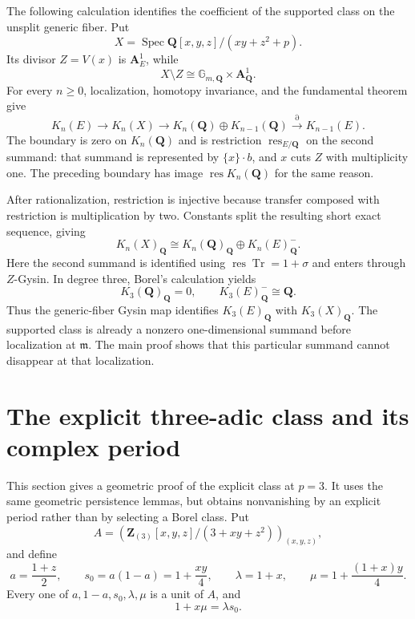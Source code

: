 \documentclass[11pt,a4paper]{amsart}
\numberwithin{equation}{section}
\theoremstyle{definition}
\theoremstyle{remark}
\newcommand{\Q}{\mathbf Q}
\newcommand{\Z}{\mathbf Z}
\newcommand{\A}{\mathbf A}
\newcommand{\m}{\mathfrak m}
\newcommand{\Spec}{\operatorname{Spec}}
\newcommand{\Qrat}{_{\Q}}
\begin{document}
The following calculation identifies the coefficient of the supported class on the unsplit generic fiber. Put
\[
X=\Spec\Q[x,y,z]/(xy+z^2+p).
\]
Its divisor $Z=V(x)$ is $\A^1_E$, while
\[
X\setminus Z\cong\mathbb G_{m,\Q}\times\A^1_{\Q}.
\]
For every $n\geq 0$, localization, homotopy invariance, and the fundamental theorem give
\[
K_n(E)\longrightarrow K_n(X)\longrightarrow
K_n(\Q)\oplus K_{n-1}(\Q)
\xrightarrow{\partial}K_{n-1}(E).
\]
The boundary is zero on $K_n(\Q)$ and is restriction $\operatorname{res}_{E/\Q}$ on the second summand: that summand is represented by $\{x\}\cdot b$, and $x$ cuts $Z$ with multiplicity one. The preceding boundary has image $\operatorname{res}K_n(\Q)$ for the same reason.

After rationalization, restriction is injective because transfer composed with restriction is multiplication by two. Constants split the resulting short exact sequence, giving
\begin{equation}\label{d3:eq:genericdecomposition}
K_n(X)\Qrat\cong K_n(\Q)\Qrat\oplus K_n(E)\Qrat^{-}.
\end{equation}
Here the second summand is identified using $\operatorname{res}\operatorname{Tr}=1+\sigma$ and enters through $Z$-Gysin. In degree three, Borel's calculation \cite[Proposition~12.2]{Borel} yields
\[
K_3(\Q)\Qrat=0,\qquad K_3(E)\Qrat^{-}\cong\Q.
\]
Thus the generic-fiber Gysin map identifies $K_3(E)\Qrat$ with $K_3(X)\Qrat$. The supported class is already a nonzero one-dimensional summand before localization at $\m$. The main proof shows that this particular summand cannot disappear at that localization.

\section{The explicit three-adic class and its complex period}\label{d3:sec:explicit}

This section gives a geometric proof of the explicit class at $p=3$. It uses the same geometric persistence lemmas, but obtains nonvanishing by an explicit period rather than by selecting a Borel class. Put
\[
A=\left(\Z_{(3)}[x,y,z]/(3+xy+z^2)\right)_{(x,y,z)},
\]
and define
\[
a=\frac{1+z}{2},\qquad s_0=a(1-a)=1+\frac{xy}{4},\qquad
\lambda=1+x,\qquad \mu=1+\frac{(1+x)y}{4}.
\]
Every one of $a,1-a,s_0,\lambda,\mu$ is a unit of $A$, and
\begin{equation}\label{d3:eq:unitsidentity}
1+x\mu=\lambda s_0.
\end{equation}
\end{document}
